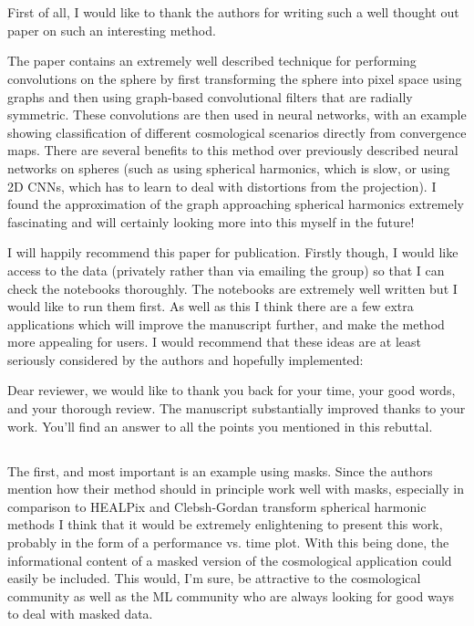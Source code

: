 \documentclass[12pt,a4paper]{article}
\newcommand{\todo}[1]{{\color[rgb]{.6,.1,.6}{TODO: #1}}}
\newcommand{\1}{\b{1}}              %
\newcommand{\0}{\b{0}}              %
\begin{document}
\section{}

\begin{mdframed}[style=comment]
First of all, I would like to thank the authors for writing such a well thought out paper on such an interesting method.

The paper contains an extremely well described technique for performing convolutions on the sphere by first transforming the sphere into pixel space using graphs and then using graph-based convolutional filters that are radially symmetric. These convolutions are then used in neural networks, with an example showing classification of different cosmological scenarios directly from convergence maps. There are several benefits to this method over previously described neural networks on spheres (such as using spherical harmonics, which is slow, or using 2D CNNs, which has to learn to deal with distortions from the projection). I found the approximation of the graph approaching spherical harmonics extremely fascinating and will certainly looking more into this myself in the future!

I will happily recommend this paper for publication. Firstly though, I would like access to the data (privately rather than via emailing the group) so that I can check the notebooks thoroughly. The notebooks are extremely well written but I would like to run them first. As well as this I think there are a few extra applications which will improve the manuscript further, and make the method more appealing for users. I would recommend that these ideas are at least seriously considered by the authors and hopefully implemented:
\end{mdframed}

\todo{@Tomek: give him access to data}

Dear reviewer, we would like to thank you back for your time, your good words, and your thorough review.
The manuscript substantially improved thanks to your work.
You'll find an answer to all the points you mentioned in this rebuttal.

\subsection{}

\begin{mdframed}[style=comment]
The first, and most important is an example using masks. Since the authors mention how their method should in principle work well with masks, especially in comparison to HEALPix and Clebsh-Gordan transform spherical harmonic methods I think that it would be extremely enlightening to present this work, probably in the form of a performance vs. time plot. With this being done, the informational content of a masked version of the cosmological application could easily be included. This would, I'm sure, be attractive to the cosmological community as well as the ML community who are always looking for good ways to deal with masked data.
\end{mdframed}
\end{document}
